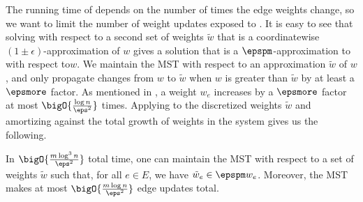 \documentclass{toc}
\newcommand{\weight}[1]{w_{#1}}
\newcommand{\weightv}{w}%
\newcommand{\apxweight}{\tilde{w}}%
\newcommand{\apxweightof}[1]{\apxweight_{#1}}%
\newcommand{\wrt}{with respect to\xspace} %
\begin{document}
The running time of  depends on the number of
times the edge weights change, so we want to limit the number of
weight updates exposed to . It is easy to see
that solving  \wrt a second set of weights
$\apxweight$ that is a
%
%
coordinatewise
%
$(1 \pm \epsilon)$-approximation %
%
of $\weightv$ gives a solution that is a
%
$\epspm$-approximation  %
to 
\wrt $\weightv$. We maintain the MST \wrt an approximation
$\apxweight$ of $\weightv$, and only propagate changes from $\weightv$
to $\apxweight$ when $\weightv$ is greater than $\apxweight$ by at
least a %
 $\epsmore$ factor.  %
As mentioned in
, a weight $\weight{e}$ increases by a
%
$\epsmore$ factor  %
at most
$\bigO{\frac{\log n}{\eps^2}}$ times. Applying 
to the discretized weights $\apxweight$ and amortizing against the
total growth of weights in the system gives us the following.
\begin{lemma}
  In $\bigO{\frac{m \log^3 n}{\eps^2}}$ total time, one can maintain
  the MST \wrt a set of weights $\apxweight$ such that, for all
  $e \in E$, we have $\apxweightof{e} \in \epspm \weight{e}$. Moreover,
  the MST makes at most $\bigO{\frac{m \log n}{\eps^2}}$ edge updates
  total.
\end{lemma}
\end{document}
